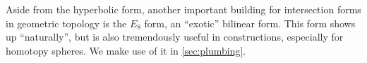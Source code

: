 Aside from the hyperbolic form, another important building for intersection forms in geometric topology is the $E_8$ form, an ``exotic'' bilinear form. This form shows up ``naturally'', but is also tremendously useful in constructions, especially for homotopy spheres. We make use of it in \cref{sec:plumbing}.

